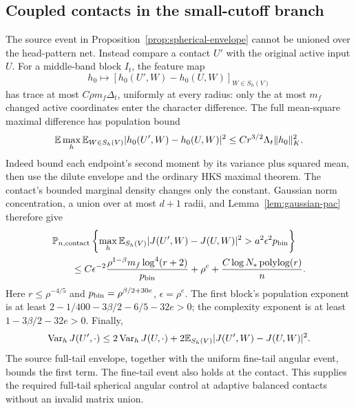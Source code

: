 \subsection{Coupled contacts in the small-cutoff branch}
The source event in Proposition~\ref{prop:spherical-envelope} cannot be
unioned over the head-pattern net. Instead compare a contact $U'$ with
the original active input $U$. For a middle-band block $I_t$, the feature
map
\[
 h_0\longmapsto[h_0(U',W)-h_0(U,W)]_{W\in S_h(V)}
\]
has trace at most $C\rho m_f\Delta_t$, uniformly at every radius:
only the at most $m_f$ changed active coordinates enter the character
difference. The full mean-square maximal difference has population
bound
\[
 \mathbb E\max_h\mathbb E_{W\in S_h(V)}|h_0(U',W)-h_0(U,W)|^2
             \le Cr^{3/2}\Lambda_t\|h_0\|_K^2.
\]
Indeed bound each endpoint's second moment by its variance plus squared
mean, then use the dilute envelope and the ordinary HKS maximal theorem.
The contact's bounded marginal density changes only the constant.
Gaussian norm concentration, a union over at most $d+1$ radii, and
Lemma~\ref{lem:gaussian-pac} therefore give
\begin{align*}
 &\mathbb P_{n,\rm contact}\left\{
 \max_h\mathbb E_{S_h(V)}|J(U',W)-J(U,W)|^2
                   >a^2\epsilon^2p_{\rm bin}\right\}\\
 &\qquad\le C\epsilon^{-2}\frac{\rho^{1-\beta}m_f\log^4(r+2)}{p_{\rm bin}}
          +\rho^c+\frac{C\log N_*\operatorname{polylog}(r)}n.
\end{align*}
Here $r\le\rho^{-4/5}$ and
$p_{\rm bin}=\rho^{\beta/2+30e}$, $\epsilon=\rho^e$.
The first block's population exponent is at least
$2-1/400-3\beta/2-6/5-32e>0$; the complexity exponent is at least
$1-3\beta/2-32e>0$.
Finally,
\[
 \operatorname{Var}_hJ(U',\cdot)\le2\operatorname{Var}_hJ(U,\cdot)
       +2\mathbb E_{S_h(V)}|J(U',W)-J(U,W)|^2.
\]
The source full-tail envelope, together with the uniform fine-tail
angular event, bounds the first term. The fine-tail event also holds
at the contact. This supplies the required full-tail spherical angular
control at adaptive balanced contacts without an invalid matrix union.

